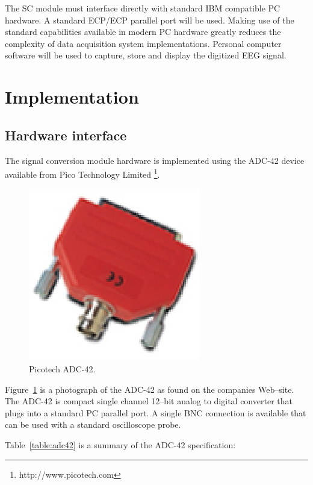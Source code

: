 The SC module must interface directly with standard IBM compatible PC
hardware. A standard ECP/ECP parallel port will be used. Making use of
the standard capabilities available in modern PC hardware greatly
reduces the complexity of data acquisition system
implementations. Personal computer software will be used to capture,
store and display the digitized EEG signal.

\section{Implementation}
\subsection{Hardware interface}

The signal conversion module hardware is implemented using the ADC-42
device available from Pico Technology Limited
\footnote{http://www.picotech.com}.

\begin{figure}[htbp]
	\begin{center}
	\includegraphics{adc42.eps} 
	\caption{Picotech ADC-42.}  
	\label{fig:ladc42}
	\end{center}
\end{figure}

Figure~\ref{fig:ladc42} is a photograph of the ADC-42 as found on the
companies Web--site. The ADC-42 is compact single channel 12--bit
analog to digital converter that plugs into a standard PC parallel
port. A single BNC connection is available that can be used with a
standard oscilloscope probe. 

Table~\ref{table:adc42} is a summary of the ADC-42 specification:

